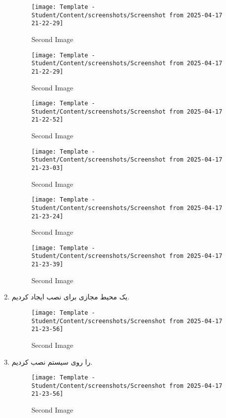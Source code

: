 \begin{enumerate}
    \begin{figure}[htbp]
      \centering
      \texttt{[image: Template - Student/Content/screenshots/Screenshot from 2025-04-17 21-22-29]}
      \caption{Second Image}
      \label{fig:vert2}
    \end{figure}
    \begin{figure}[htbp]
      \centering
      \texttt{[image: Template - Student/Content/screenshots/Screenshot from 2025-04-17 21-22-29]}
      \caption{Second Image}
      \label{fig:vert2}
    \end{figure}
    \begin{figure}[htbp]
      \centering
      \texttt{[image: Template - Student/Content/screenshots/Screenshot from 2025-04-17 21-22-52]}
      \caption{Second Image}
      \label{fig:vert2}
    \end{figure}
    \begin{figure}[htbp]
      \centering
      \texttt{[image: Template - Student/Content/screenshots/Screenshot from 2025-04-17 21-23-03]}
      \caption{Second Image}
      \label{fig:vert2}
    \end{figure}
    \begin{figure}[htbp]
      \centering
      \texttt{[image: Template - Student/Content/screenshots/Screenshot from 2025-04-17 21-23-24]}
      \caption{Second Image}
      \label{fig:vert2}
    \end{figure}
    \begin{figure}[htbp]
      \centering
      \texttt{[image: Template - Student/Content/screenshots/Screenshot from 2025-04-17 21-23-39]}
      \caption{Second Image}
      \label{fig:vert2}
    \end{figure}
    \item یک محیط مجازی برای نصب  ایجاد کردیم.
    \begin{figure}[]
      \centering
      \texttt{[image: Template - Student/Content/screenshots/Screenshot from 2025-04-17 21-23-56]}
      \caption{Second Image}
      \label{fig:vert2}
    \end{figure}
    \item {} را روی سیستم نصب کردیم.
    \begin{figure}[htbp]
      \centering
      \texttt{[image: Template - Student/Content/screenshots/Screenshot from 2025-04-17 21-23-56]}
      \caption{Second Image}
      \label{fig:vert2}

\end{figure}
\end{enumerate}
